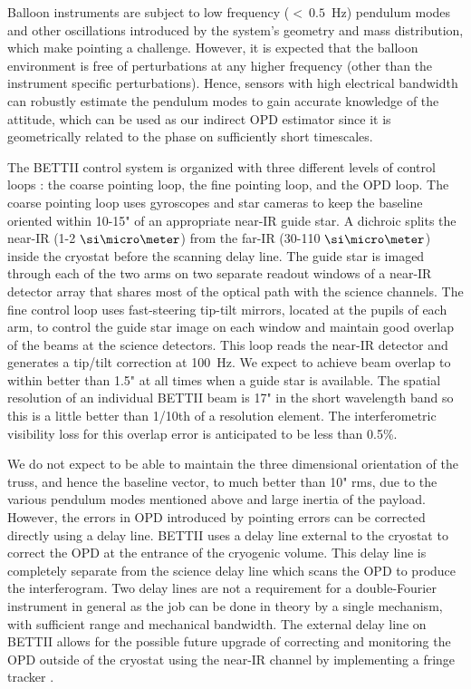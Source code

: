 Balloon instruments are subject to low frequency ($<~0.5$~Hz) pendulum modes and other oscillations introduced by the system's geometry and mass distribution, which make pointing a challenge. However, it is expected that the balloon environment is free of perturbations at any higher frequency (other than the instrument specific perturbations). Hence, sensors with high electrical bandwidth can robustly estimate the pendulum modes to gain accurate knowledge of the attitude, which can be used as our indirect OPD estimator since it is geometrically related to the phase on sufficiently short timescales.

The BETTII control system is organized with three different levels of control loops \citep{Rizzo:2014jq}: the coarse pointing loop, the fine pointing loop, and the OPD loop. The coarse pointing loop uses gyroscopes and star cameras to keep the baseline oriented within 10-15" of an appropriate near-IR guide star. A dichroic splits the near-IR (1-2$~\um$) from the far-IR (30-110$~\um$) inside the cryostat before the scanning delay line. The guide star is imaged through each of the two arms on two separate readout windows of a near-IR detector array that shares most of the optical path with the science channels. The fine control loop uses fast-steering tip-tilt mirrors, located at the pupils of each arm, to control the guide star image on each window and maintain good overlap of the beams at the science detectors. This loop reads the near-IR detector and generates a tip/tilt correction at 100~Hz. We expect to achieve beam overlap to within better than 1.5" at all times when a guide star is available. The spatial resolution of an individual BETTII beam
is 17" in the short wavelength band so this is a little better than 1/10th of a resolution element. The interferometric visibility loss
for this overlap error is anticipated to be less than 0.5\%.

We do not expect to be able to maintain the three dimensional orientation of the truss, and hence the baseline
vector, to much better than 10" rms, due to the various pendulum modes mentioned above and large inertia of the payload.
However, the errors in OPD introduced by pointing errors can be corrected directly using a delay line. BETTII uses a delay line external to the cryostat to correct the OPD at the entrance of the cryogenic volume. This delay line is completely separate from the science delay line which scans the OPD to produce the interferogram. Two delay lines are not a requirement for a double-Fourier instrument in general as the job can be done in theory by a single mechanism, with sufficient range and mechanical bandwidth. The external delay line on BETTII allows for the possible future upgrade
of correcting and monitoring the OPD outside of the cryostat using the near-IR channel by implementing a fringe tracker \citep{Rizzo:2012jp}.

